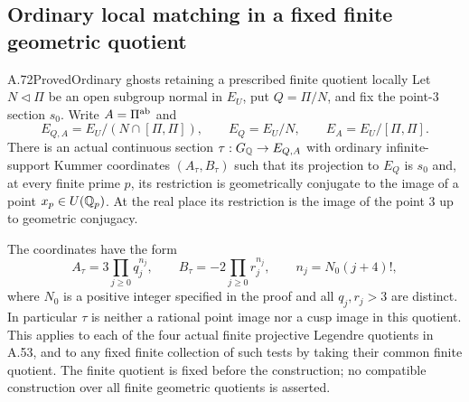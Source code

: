 \subsection{Ordinary local matching in a fixed finite geometric quotient}

\begin{statement}{A.72}{Proved}{Ordinary ghosts retaining a prescribed finite quotient locally}
Let $N\triangleleft\Pi$ be an open subgroup normal in $E_U$, put
$Q=\Pi/N$, and fix the point-$3$ section $s_0$.
Write $A=\Pi^{\rm ab}$ and
\[
 E_{Q,A}=E_U/(N\cap[\Pi,\Pi]),\qquad
 E_Q=E_U/N,\qquad E_A=E_U/[\Pi,\Pi].
\tag{A.72.1}
\]
There is an actual continuous section $\tau:G_\mathbb Q\to E_{Q,A}$
with ordinary infinite-support Kummer coordinates $(A_\tau,B_\tau)$
such that its projection to $E_Q$ is $s_0$ and, at every finite
prime $p$, its restriction is geometrically conjugate to the image
of a point $x_p\in U(\mathbb Q_p)$.  At the real place its restriction is
the image of the point $3$ up to geometric conjugacy.

The coordinates have the form
\[
 A_\tau=3\prod_{j\geq0}q_j^{n_j},\qquad
 B_\tau=-2\prod_{j\geq0}r_j^{n_j},\qquad
 n_j=N_0(j+4)!,
\tag{A.72.2}
\]
where $N_0$ is a positive integer specified in the proof and all
$q_j,r_j>3$ are distinct.  In particular $\tau$ is neither a rational
point image nor a cusp image in this quotient.
This applies to each of the four actual finite projective Legendre
quotients in A.53, and to any fixed finite collection of such tests
by taking their common finite quotient.
The finite quotient is fixed before the construction; no compatible
construction over all finite geometric quotients is asserted.
\end{statement}
